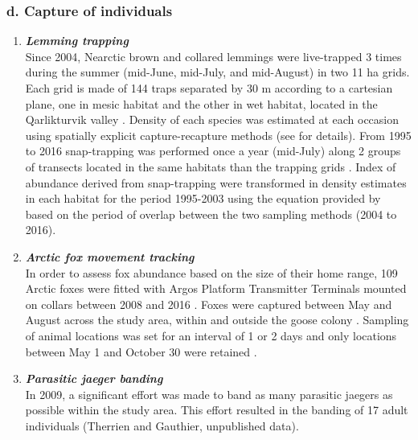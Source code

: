 \documentclass[a4paper,twoside,12pt]{article}
\begin{document}
\subsubsection*{d. Capture of individuals}
\begin{enumerate}[label=\roman*]
\item[] \textit{\textbf{Lemming trapping}}\\
Since 2004, Nearctic brown and collared lemmings were live-trapped 3 times during the summer (mid-June, mid-July, and mid-August) in two 11 ha grids. Each grid is made of 144 traps separated by 30 m according to a cartesian plane, one in mesic habitat and the other in wet habitat, located in the Qarlikturvik valley \citep{fauteux2015, gauthier2020lemmings}. Density of each species was estimated at each occasion using spatially explicit capture-recapture methods (see \citet{fauteux2015} for details). From 1995 to 2016 snap-trapping was performed once a year (mid-July) along 2 groups of transects located in the same habitats than the trapping grids \citep{gruyer2008}. Index of abundance derived from snap-trapping were transformed in density estimates in each habitat for the period 1995-2003 using the equation provided by \citet{fauteux2018} based on the period of overlap between the two sampling methods (2004 to 2016). 
\\
\item[] \textit{\textbf{Arctic fox movement tracking}}\\
In order to assess fox abundance based on the size of their home range, 109 Arctic foxes were fitted with Argos Platform Transmitter Terminals mounted on collars between 2008 and 2016 \citep{lai2015,christin2015, dulude2023}. Foxes were captured between May and August across the study area, within and outside the goose colony \citep{dulude2023}. Sampling of animal locations was set for an interval of 1 or 2 days and only locations between May 1 and October 30 were retained \citep{dulude2023}.
\\
\item[] \textit{\textbf{Parasitic jaeger banding}}\\
In 2009, a significant effort was made to band as many parasitic jaegers as possible within the study area. This effort resulted in the banding of 17 adult individuals (Therrien and Gauthier, unpublished data).
\end{enumerate}
\end{document}
